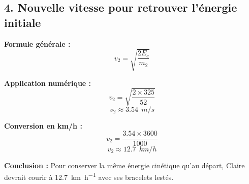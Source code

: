 \documentclass[a4paper,12pt]{article}
\begin{document}
\subsection*{4. Nouvelle vitesse pour retrouver l'énergie initiale}
\begin{compactitem}
    \item \textbf{Formule générale :}
    \begin{equation}
        v_2 = \sqrt{\frac{2 E_c}{m_2}}
    \end{equation}
    \item \textbf{Application numérique :}
    \begin{equation}
        v_2 = \sqrt{\frac{2 \times 325}{52}}
    \end{equation}
    \begin{equation}
        v_2 \approx 3.54\ \SI{}{m\per s}
    \end{equation}
    \item \textbf{Conversion en km/h :}
    \begin{equation}
        v_2 = \frac{3.54 \times 3600}{1000}
    \end{equation}
    \begin{equation}
        v_2 \approx 12.7\ \SI{}{km\per h}
    \end{equation}
    \item \textbf{Conclusion :} Pour conserver la même énergie cinétique qu'au départ, Claire devrait courir à \SI{12.7}{km\per h} avec ses bracelets lestés.
\end{compactitem}
\end{document}
